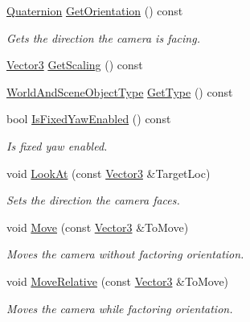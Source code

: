 \begin{DoxyCompactItemize}
\hyperlink{classMezzanine_1_1Quaternion}{Quaternion} \hyperlink{classMezzanine_1_1Camera_af693fe97c4f281940a33dc8087a80fcb}{GetOrientation} () const 
\begin{DoxyCompactList}\small\item\em Gets the direction the camera is facing. \item\end{DoxyCompactList}\item 
\hyperlink{classMezzanine_1_1Vector3}{Vector3} \hyperlink{classMezzanine_1_1Camera_a026f364d2eb9a13d216cd9d6c600db17}{GetScaling} () const 
\item 
\hyperlink{namespaceMezzanine_ae8cd04f706f4998be62f454b7119c718}{WorldAndSceneObjectType} \hyperlink{classMezzanine_1_1Camera_a1c00772101a06add4b3dde9e3bc9f8aa}{GetType} () const 
\item 
bool \hyperlink{classMezzanine_1_1Camera_adfe5be54632aeedb9656c850f3f03ae5}{IsFixedYawEnabled} () const 
\begin{DoxyCompactList}\small\item\em Is fixed yaw enabled. \item\end{DoxyCompactList}\item 
void \hyperlink{classMezzanine_1_1Camera_a8343f2d2fb174937aef2894ebf8a5e29}{LookAt} (const \hyperlink{classMezzanine_1_1Vector3}{Vector3} \&TargetLoc)
\begin{DoxyCompactList}\small\item\em Sets the direction the camera faces. \item\end{DoxyCompactList}\item 
void \hyperlink{classMezzanine_1_1Camera_afdc17999a097218df445370123d41239}{Move} (const \hyperlink{classMezzanine_1_1Vector3}{Vector3} \&ToMove)
\begin{DoxyCompactList}\small\item\em Moves the camera without factoring orientation. \item\end{DoxyCompactList}\item 
void \hyperlink{classMezzanine_1_1Camera_ac8f450698006baf6e8fca2a864d59533}{MoveRelative} (const \hyperlink{classMezzanine_1_1Vector3}{Vector3} \&ToMove)
\begin{DoxyCompactList}\small\item\em Moves the camera while factoring orientation. \item\end{DoxyCompactList}\item 

\end{DoxyCompactItemize}
